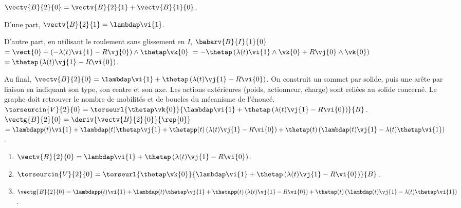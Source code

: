 \begin{corrigebox}
$\vectv{B}{2}{0}=\vectv{B}{2}{1}+\vectv{B}{1}{0}$.

D'une part,  $\vectv{B}{2}{1}=\lambdap\vi{1}$.

D'autre part, en utilisant le roulement sans glissement en $I$, 
$\babarv{B}{I}{1}{0} $ $=\vect{0}+\left(-\lambda(t)\vi{1}-R\vj{0} \right)\wedge\thetap \vk{0}$
$=-\thetap\left(\lambda(t)\vi{1}\wedge \vk{0}+R\vj{0}\wedge \vk{0} \right)$
$=\thetap\left(\lambda(t)\vj{1}-R\vi{0} \right)$.

Au final, $\vectv{B}{2}{0} = \lambdap\vi{1} + \thetap\left(\lambda(t)\vj{1}-R\vi{0} \right)$.
On construit un sommet par solide, puis une arête par liaison en
        indiquant son type, son centre et son axe. Les actions extérieures (poids,
        actionneur, charge) sont reliées au solide concerné. Le graphe doit retrouver le
        nombre de mobilités et de boucles du mécanisme de l'énoncé.
$\torseurcin{V}{2}{0}=\torseurl{\thetap \vk{0}}{ \lambdap\vi{1} + \thetap\left(\lambda(t)\vj{1}-R\vi{0} \right)}{B}$.
$\vectg{B}{2}{0} = \deriv{\vectv{B}{2}{0}}{\rep{0}}$
$ = \lambdapp(t)\vi{1} +\lambdap(t)\thetap\vj{1} 
+ \thetapp(t)\left(\lambda(t)\vj{1}-R\vi{0} \right)
+ \thetap(t)\left(\lambdap(t)\vj{1}-\lambda(t)\thetap\vi{1} \right)
$.

\begin{enumerate}
\item $\vectv{B}{2}{0} = \lambdap\vi{1} + \thetap\left(\lambda(t)\vj{1}-R\vi{0} \right)$.
\item $\torseurcin{V}{2}{0}=\torseurl{\thetap \vk{0}}{ \lambdap\vi{1} + \thetap\left(\lambda(t)\vj{1}-R\vi{0} \right)}{B}$.
\item $\vectg{B}{2}{0}  = \lambdapp(t)\vi{1} +\lambdap(t)\thetap\vj{1} 
+ \thetapp(t)\left(\lambda(t)\vj{1}-R\vi{0} \right)
+ \thetap(t)\left(\lambdap(t)\vj{1}-\lambda(t)\thetap\vi{1} \right)
$.
\end{enumerate}
\end{corrigebox}
